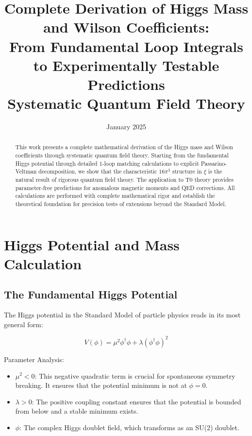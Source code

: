 \author{}
\date{January 2025}


	\hfuzz=200pt
	\allowdisplaybreaks
	
	\title{Complete Derivation of Higgs Mass and Wilson Coefficients:\\
		From Fundamental Loop Integrals to Experimentally Testable Predictions\\
		Systematic Quantum Field Theory}
	
	\begin{abstract}
		This work presents a complete mathematical derivation of the Higgs mass and Wilson coefficients through systematic quantum field theory. Starting from the fundamental Higgs potential through detailed 1-loop matching calculations to explicit Passarino-Veltman decomposition, we show that the characteristic $16\pi^3$ structure in $\xi$ is the natural result of rigorous quantum field theory. The application to T0 theory provides parameter-free predictions for anomalous magnetic moments and QED corrections. All calculations are performed with complete mathematical rigor and establish the theoretical foundation for precision tests of extensions beyond the Standard Model.
	\end{abstract}
	
	\tableofcontents
	
	\section{Higgs Potential and Mass Calculation}
	
	\subsection{The Fundamental Higgs Potential}
	
	The Higgs potential in the Standard Model of particle physics reads in its most general form:
	
	\begin{equation}
		V(\phi) = \mu^2 \phi^\dagger\phi + \lambda(\phi^\dagger\phi)^2
	\end{equation}
	
	\begin{important}
		Parameter Analysis:
		\begin{itemize}
			\item $\mu^2 < 0$: This negative quadratic term is crucial for spontaneous symmetry breaking. It ensures that the potential minimum is not at $\phi = 0$.
			\item $\lambda > 0$: The positive coupling constant ensures that the potential is bounded from below and a stable minimum exists.
			\item $\phi$: The complex Higgs doublet field, which transforms as an SU(2) doublet.
		\end{itemize}
	\end{important}
	
